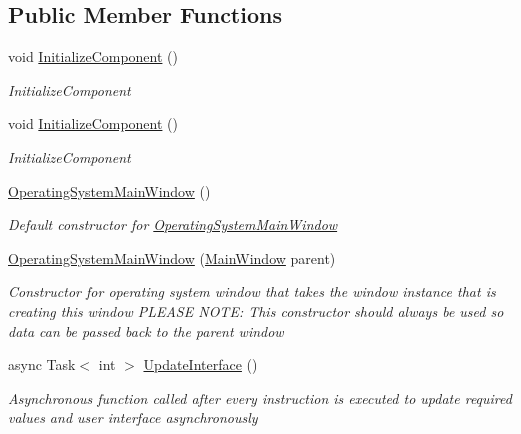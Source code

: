 \subsection*{Public Member Functions}
\begin{DoxyCompactItemize}
\item 
void \hyperlink{class_c_p_u___o_s___simulator_1_1_operating_system_main_window_abf657079159db7bb54ea7089f5b7b5db}{Initialize\+Component} ()
\begin{DoxyCompactList}\small\item\em Initialize\+Component \end{DoxyCompactList}\item 
void \hyperlink{class_c_p_u___o_s___simulator_1_1_operating_system_main_window_abf657079159db7bb54ea7089f5b7b5db}{Initialize\+Component} ()
\begin{DoxyCompactList}\small\item\em Initialize\+Component \end{DoxyCompactList}\item 
\hyperlink{class_c_p_u___o_s___simulator_1_1_operating_system_main_window_a6ebb63e5bf2709cb0281434c651845dc}{Operating\+System\+Main\+Window} ()
\begin{DoxyCompactList}\small\item\em Default constructor for \hyperlink{class_c_p_u___o_s___simulator_1_1_operating_system_main_window}{Operating\+System\+Main\+Window} \end{DoxyCompactList}\item 
\hyperlink{class_c_p_u___o_s___simulator_1_1_operating_system_main_window_a2e4a26004957e2b1f1c4376f0a6656ab}{Operating\+System\+Main\+Window} (\hyperlink{class_c_p_u___o_s___simulator_1_1_main_window}{Main\+Window} parent)
\begin{DoxyCompactList}\small\item\em Constructor for operating system window that takes the window instance that is creating this window P\+L\+E\+A\+S\+E N\+O\+T\+E\+: This constructor should always be used so data can be passed back to the parent window \end{DoxyCompactList}\item 
async Task$<$ int $>$ \hyperlink{class_c_p_u___o_s___simulator_1_1_operating_system_main_window_a365c0f87c8e59dc4ce9cc33ce52bf50e}{Update\+Interface} ()
\begin{DoxyCompactList}\small\item\em Asynchronous function called after every instruction is executed to update required values and user interface asynchronously \end{DoxyCompactList}\end{DoxyCompactItemize}
